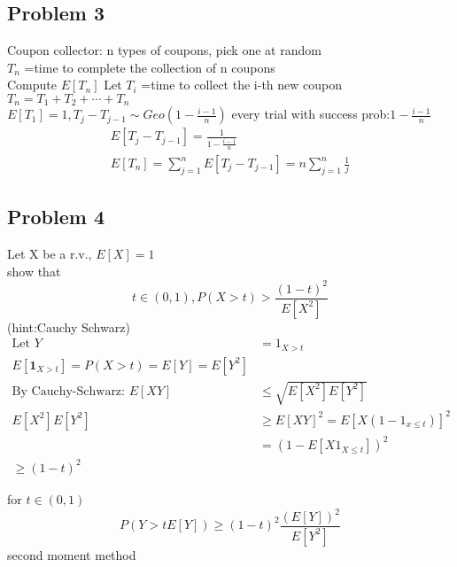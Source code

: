 \subsection*{Problem 3}
Coupon collector: n types of coupons, pick one at random
\\$ T_n $ =time to complete the collection of n coupons
\\Compute $ E[T_n] $
Let $ T_i $ =time to collect the i-th new coupon
\\$ T_n=T_1+T_2+\cdots+T_n $
\\$ E[T_1]=1, T_j-T_{j-1}\sim Geo(1-\frac{i-1}{n})$ every trial with success prob:$ 1-\frac{i-1}{n} $
\begin{align*}{}{}
E[T_j-T_{j-1}]=\frac{1}{1-\frac{i-1}{n}}\\
E[T_n]=\sum_{j=1}^{n}E[T_j-T_{j-1}]=n\sum_{j=1}^{n}\frac{1}{j}
\end{align*} 
\subsection*{Problem 4}
Let X be a r.v., $ E[X]=1 $
\\show that $$ t\in(0,1), P(X>t)>\frac{(1-t)^2}{E[X^2]}$$
(hint:Cauchy Schwarz)
\begin{align*}{}{}
\text{Let }Y&=1_{X>t}\\
E[\mathbf{1}_{X>t}]=P(X>t)=E[Y]=E[Y^2]\\
\text{By Cauchy-Schwarz: }E[XY]&\leq \sqrt{E[X^2]E[Y^2]}\\
E[X^2]E[Y^2]&\geq E[XY]^2=E[X(1-1_{x\leq t})]^2\\
&=(1-E[X1_{X\leq t}])^2\\
\geq (1-t)^2
\end{align*}
\begin{definition}{}
    for $ t\in (0,1) $ 
$$P(Y>tE[Y])\geq (1-t)^2\frac{(E[Y])^2}{E[Y^2]}$$
second moment method
\end{definition}
